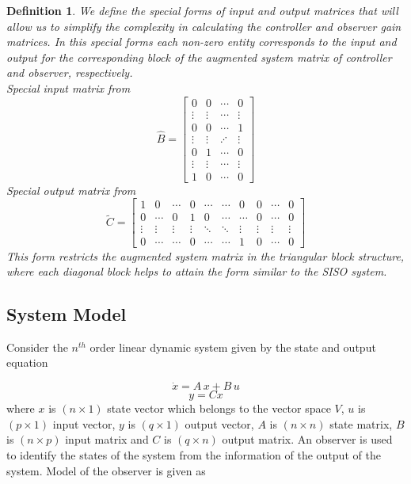 \documentclass{elsarticle}
\newtheorem{Definition}{Definition}
\numberwithin{equation}{section}
\begin{document}
\begin{Definition} \label{objective}
We define the special forms of input and output matrices that will allow us to simplify the complexity in calculating the controller and observer gain matrices. In this special forms each non-zero entity corresponds to the input and output for the corresponding block of the augmented system matrix of controller and observer, respectively.\\
Special input matrix from
\begin{equation*}
	\widehat{B} = \begin{bmatrix}
   	0 & 0 & \cdots & 0\\
   	\vdots &\vdots &\cdots & \vdots\\
   	0 & 0 &\cdots & 1\\
   	\vdots &\vdots &\iddots & \vdots\\
	0 & 1 & \cdots & 0\\
	\vdots &\vdots &\cdots & \vdots\\
	1 & 0 &\cdots & 0
  	\end{bmatrix}
\end{equation*}
Special output matrix from
\begin{equation*}
	\widetilde{C} = \begin{bmatrix}
   	1 & 0 & \cdots & 0 &\cdots & \cdots & 0 & 0 & \cdots & 0\\
	0 & \cdots & 0 & 1 & 0 & \cdots & \cdots & 0 & \cdots & 0\\
	\vdots &\vdots & \vdots & \vdots & \ddots & \ddots & \vdots & \vdots & \vdots 	& \vdots \\
	0 & \cdots & \cdots & 0 & \cdots & \cdots & 1 & 0 & \cdots & 0
  	\end{bmatrix}
\end{equation*} 
This form restricts the augmented system matrix in the triangular block structure, where each diagonal block helps to attain the form similar to the SISO system.

\end{Definition}

\subsection{System Model}

Consider the $n^{th}$ order linear dynamic system given by the state and output equation

\begin{equation}\label{stateeq}
	\dot{x}=A\,x+B\,u
\end{equation}
\vspace{-.5cm}
\begin{equation}\label{outputeq}
	y=Cx
\end{equation}
where $x$ is $(n \times 1)$ state vector which belongs to the vector space $V$, $u$ is $(p \times 1)$ input vector, $y$ is $(q \times 1)$ output vector, $A$ is  $(n \times n)$ state matrix, $B$ is $(n \times p)$ input matrix and $C$ is $(q \times n)$ output matrix. An observer is used to identify the states of the system from the information of the output of the system. Model of the observer is given as
\end{document}
